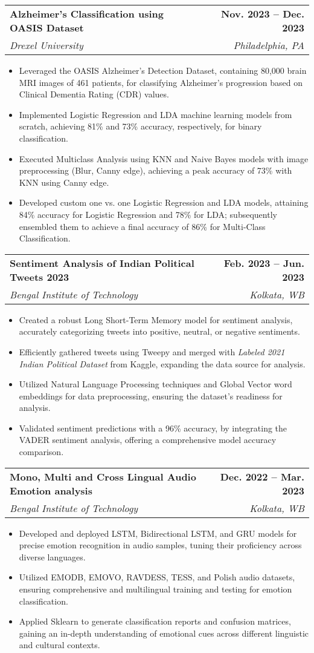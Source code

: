 \documentclass[letterpaper,10pt]{article}
\makeatletter
\newcommand{\resumeItem}[1]{
  \item\small{
    {#1 \vspace{-5pt}}
  }
}
\newcommand{\resumeSubheading}[4]{
  \vspace{0pt}\item
    \begin{tabular*}{0.97\textwidth}[t]{l@{\extracolsep{\fill}}r}
      \textbf{#1} & \textbf{#2} \\
      \textit{\small#3} & \textit{\small #4} \\
    \end{tabular*}\vspace{-10pt}
}
\newcommand{\resumeItemListStart}{\begin{itemize}}
\newcommand{\resumeItemListEnd}{\end{itemize}\vspace{-5pt}}
\makeatother
\begin{document}
    \resumeSubheading
    {Alzheimer's Classification using OASIS Dataset}{Nov. 2023 -- Dec. 2023}
    {Drexel University}{Philadelphia, PA}
    \resumeItemListStart
      \resumeItem{Leveraged the OASIS Alzheimer's Detection Dataset, containing 80,000 brain MRI images of 461 patients, for classifying Alzheimer's progression based on Clinical Dementia Rating (CDR) values.}
      \resumeItem{Implemented Logistic Regression and LDA machine learning models from scratch, achieving 81\% and 73\% accuracy, respectively, for binary classification.}
      \resumeItem{Executed Multiclass Analysis using KNN and Naive Bayes models with image preprocessing (Blur, Canny edge), achieving a peak accuracy of 73\% with KNN using Canny edge.}
      \resumeItem{Developed custom one vs. one Logistic Regression and LDA models, attaining 84\% accuracy for Logistic Regression and 78\% for LDA; subsequently ensembled them to achieve a final accuracy of 86\% for Multi-Class Classification.}
    \resumeItemListEnd
      
    \resumeSubheading
    {Sentiment Analysis of Indian Political Tweets 2023}{Feb. 2023 -- Jun. 2023}
    {Bengal Institute of Technology}{Kolkata, WB}
    \resumeItemListStart
      \resumeItem{Created a robust Long Short-Term Memory model for sentiment analysis, accurately categorizing tweets into positive, neutral, or negative sentiments.}
      \resumeItem{Efficiently gathered tweets using Tweepy and merged with \emph{Labeled 2021 Indian Political Dataset} from Kaggle, expanding the data source for analysis.}
      \resumeItem{Utilized Natural Language Processing techniques and Global Vector word embeddings for data preprocessing, ensuring the dataset's readiness for analysis.}
      \resumeItem{Validated sentiment predictions with a 96\% accuracy, by integrating the VADER sentiment analysis, offering a comprehensive model accuracy comparison.}
    \resumeItemListEnd

  \resumeSubheading
    {Mono, Multi and Cross Lingual Audio Emotion analysis}{Dec. 2022 -- Mar. 2023}
    {Bengal Institute of Technology}{Kolkata, WB}
    \resumeItemListStart
      \resumeItem{Developed and deployed LSTM, Bidirectional LSTM, and GRU models for precise emotion recognition in audio samples, tuning their proficiency across diverse languages.}
      \resumeItem{Utilized EMODB, EMOVO, RAVDESS, TESS, and Polish audio datasets, ensuring comprehensive and multilingual training and testing for emotion classification.}
      \resumeItem{Applied Sklearn to generate classification reports and confusion matrices, gaining an in-depth understanding of emotional cues across different linguistic and cultural contexts.}
    \resumeItemListEnd
\end{document}
